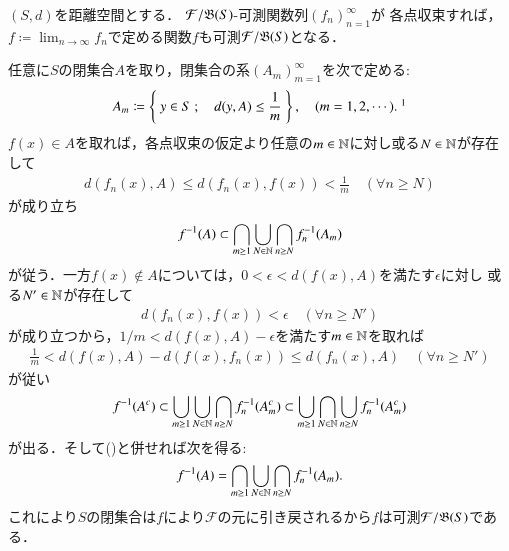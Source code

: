 	\begin{screen}
		\begin{lem}[距離空間値可測関数列の各点極限は可測]
			$(S,d)$を距離空間とする．
			$\mathcal{F}/\mathfrak{B}(S)$-可測関数列$(f_n)_{n=1}^{\infty}$が
			各点収束すれば，
			$f \coloneqq \lim_{n \to \infty} f_n$で定める関数$f$も可測$\mathcal{F}/\mathfrak{B}(S)$となる．
		\end{lem}
	\end{screen}
	
	\begin{prf}
		任意に$S$の閉集合$A$を取り，閉集合の系$(A_m)_{m=1}^{\infty}$を次で定める:
		\begin{align}
			A_m \coloneqq \Set{y \in S}{d(y,A) \leq \frac{1}{m}}, \quad (m=1,2,\cdots).\ \footnotemark
		\end{align}
		\footnotetext{
			$S \ni y \longmapsto d(y,A) \in [0,\infty)$は連続であるから，
			閉集合$[0,1/m]$は$S$の閉集合に引き戻される．
		}
		$f(x) \in A$を取れば，各点収束の仮定より任意の$m \in \mathbb{N}$に対し或る$N \in \mathbb{N}$が存在して
		\begin{align}
			d\left( f_n(x),A \right) \leq d\left( f_n(x),f(x) \right) < \frac{1}{m}
			\quad (\forall n \geq N)
		\end{align}
		が成り立ち
		\begin{align}
			f^{-1}(A) \subset \bigcap_{m \geq 1} \bigcup_{N \in \mathbb{N}} \bigcap_{n \geq N} f_n^{-1}(A_m)
			\label{eq:lem_measurability_metric_space}
		\end{align}
		が従う．一方$f(x) \notin A$については，$0 < \epsilon < d(f(x),A)$を満たす$\epsilon$に対し
		或る$N' \in \mathbb{N}$が存在して
		\begin{align}
			d\left( f_n(x), f(x) \right) < \epsilon
			\quad (\forall n \geq N')
		\end{align}
		が成り立つから，$1/m < d(f(x),A) - \epsilon$を満たす$m \in \mathbb{N}$を取れば
		\begin{align}
			\frac{1}{m} < d(f(x),A) - d(f(x),f_n(x)) \leq d(f_n(x),A)
			\quad (\forall n \geq N')
		\end{align}
		が従い
		\begin{align}
			f^{-1}(A^c) \subset \bigcup_{m \geq 1} \bigcup_{N \in \mathbb{N}} \bigcap_{n \geq N} f_n^{-1}(A_m^c)
			\subset \bigcup_{m \geq 1} \bigcap_{N \in \mathbb{N}} \bigcup_{n \geq N} f_n^{-1}(A_m^c)
		\end{align}
		が出る．そして()と併せれば次を得る:
		\begin{align}
			f^{-1}(A) = \bigcap_{m \geq 1} \bigcup_{N \in \mathbb{N}} \bigcap_{n \geq N} f_n^{-1}(A_m).
		\end{align}
		これにより$S$の閉集合は$f$により$\mathcal{F}$の元に引き戻されるから$f$は可測$\mathcal{F}/\mathfrak{B}(S)$である．
		\QED
	\end{prf}

